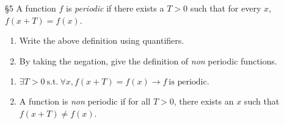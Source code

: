 \documentclass{homework}
\begin{document}
\begin{problem}{\S 5}
  A function $f$ is \textit{periodic} if there exists a $T>0$ such that for every $x$, $f(x+T) =
  f(x)$.
  \begin{enumerate}[label=(\alph*)]
    \item Write the above definition using quantifiers.
    \item By taking the negation, give the definition of \textit{non} periodic functions.
  \end{enumerate}
\end{problem}

\begin{solution}
  \begin{enumerate}[label=(\alph*)]
    \item $\exists T>0~\text{s.t.}~ \forall x, f(x+T)=f(x) \to f ~\text{is periodic.}$ 
    \item A function is \textit{non} periodic if for all $T>0$, there exists an $x$ such that $f(x+T) \neq f(x)$.
  \end{enumerate}
\end{solution}


 
\end{document}
